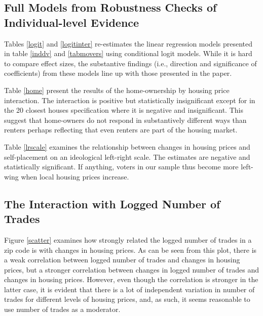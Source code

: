 \documentclass[12pt,a4paper]{article}
\begin{document}
			
			 
			
			\newpage
			
			\subsection{Full Models from Robustness Checks of Individual-level Evidence} \label{app_robustind}
			
			\setcounter{table}{0}
			
			Tables \ref{logit} and \ref{logitinter} re-estimates the linear regression models presented in table \ref{inddv} and \ref{tabmovers} using conditional logit models. While it is hard to compare effect sizes, the substantive findings (i.e., direction and significance of coefficients) from these models line up with those presented in the paper.
			
			Table  \ref{home} present the results of the home-ownership by housing price interaction. The interaction is positive but statistically insignificant except for in the 20 closest houses specification where it is negative and insignificant. This suggest that home-owners do not respond in substantively different ways than renters perhaps reflecting that even renters are part of the housing market.
			
			Table \ref{lrscale} examines the relationship between changes in housing prices and  self-placement on an ideological left-right scale. The estimates are negative and statistically significant. If anything, voters in our sample thus become more left-wing when local housing prices increase.
			
			
			
			
			
			
			\newpage
			
			\subsection{The Interaction with Logged Number of Trades} \label{app_interaction}
			\setcounter{table}{0}
			\setcounter{figure}{0}
			
			Figure \ref{scatter} examines how strongly related the logged number of trades in a zip code is with changes in housing prices. As can be seen from this plot, there is a weak correlation between logged number of trades and changes in housing prices, but a stronger correlation between changes in logged number of trades and changes in housing prices. However, even though the correlation is stronger in the latter case, it is evident that there is a lot of independent variation in number of trades for different levels of housing prices, and, as such, it seems reasonable to use number of trades as a moderator.
			
\end{document}

